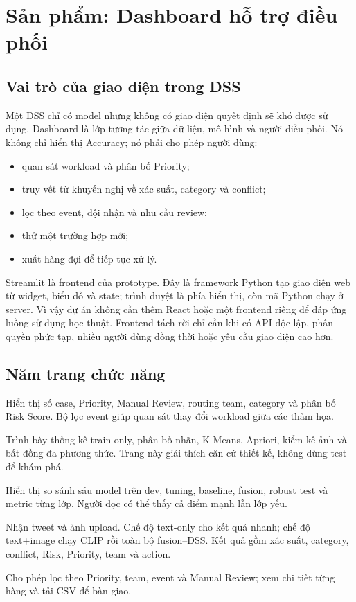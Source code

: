 \chapter{Sản phẩm: Dashboard hỗ trợ điều phối}
\label{chap:dashboard}

\section{Vai trò của giao diện trong DSS}

Một DSS chỉ có model nhưng không có giao diện quyết định sẽ khó được sử dụng.
Dashboard là lớp tương tác giữa dữ liệu, mô hình và người điều phối. Nó không
chỉ hiển thị Accuracy; nó phải cho phép người dùng:

\begin{itemize}[leftmargin=*]
  \item quan sát workload và phân bố Priority;
  \item truy vết từ khuyến nghị về xác suất, category và conflict;
  \item lọc theo event, đội nhận và nhu cầu review;
  \item thử một trường hợp mới;
  \item xuất hàng đợi để tiếp tục xử lý.
\end{itemize}

Streamlit là frontend của prototype. Đây là framework Python tạo giao diện web
từ widget, biểu đồ và state; trình duyệt là phía hiển thị, còn mã Python chạy ở
server. Vì vậy dự án không cần thêm React hoặc một frontend riêng để đáp ứng
luồng sử dụng học thuật. Frontend tách rời chỉ cần khi có API độc lập, phân
quyền phức tạp, nhiều người dùng đồng thời hoặc yêu cầu giao diện cao hơn.

\section{Năm trang chức năng}

\begin{description}[leftmargin=3.8cm,style=nextline]
  \item[Overview] Hiển thị số case, Priority, Manual Review, routing team,
        category và phân bố Risk Score. Bộ lọc event giúp quan sát thay đổi
        workload giữa các thảm họa.
  \item[EDA] Trình bày thống kê train-only, phân bố nhãn, K-Means, Apriori,
        kiểm kê ảnh và bất đồng đa phương thức. Trang này giải thích căn cứ
        thiết kế, không dùng test để khám phá.
  \item[Model Evaluation] Hiển thị so sánh sáu model trên dev, tuning,
        baseline, fusion, robust test và metric từng lớp. Người đọc có thể thấy
        cả điểm mạnh lẫn lớp yếu.
  \item[Single-Case Demo] Nhận tweet và ảnh upload. Chế độ text-only cho kết quả
        nhanh; chế độ text+image chạy CLIP rồi toàn bộ fusion--DSS. Kết quả gồm
        xác suất, category, conflict, Risk, Priority, team và action.
  \item[Priority Queue] Cho phép lọc theo Priority, team, event và Manual Review;
        xem chi tiết từng hàng và tải CSV để bàn giao.
\end{description}

